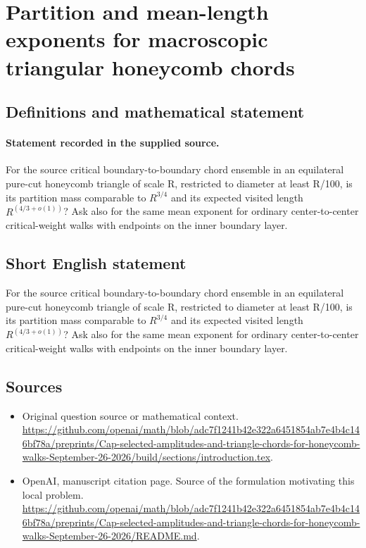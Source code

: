 \documentclass[11pt]{article}
\begin{document}
\section*{Partition and mean-length exponents for macroscopic triangular honeycomb chords}\label{statement}
\subsection{Definitions and mathematical statement}
\paragraph{Statement recorded in the supplied source.}
For the source critical boundary-to-boundary chord ensemble in an equilateral pure-cut honeycomb triangle of scale R, restricted to diameter at least R/100, is its partition mass comparable to $R^{3/4}$ and its expected visited length $R^(4/3+o(1))$? Ask also for the same mean exponent for ordinary center-to-center critical-weight walks with endpoints on the inner boundary layer.
\subsection{Short English statement}
For the source critical boundary-to-boundary chord ensemble in an equilateral pure-cut honeycomb triangle of scale R, restricted to diameter at least R/100, is its partition mass comparable to $R^{3/4}$ and its expected visited length $R^(4/3+o(1))$? Ask also for the same mean exponent for ordinary center-to-center critical-weight walks with endpoints on the inner boundary layer.
\subsection{Sources}
\begin{itemize}
\item[S1] Original question source or mathematical context.
\url{https://github.com/openai/math/blob/adc7f1241b42e322a6451854ab7e4b4c146bf78a/preprints/Cap-selected-amplitudes-and-triangle-chords-for-honeycomb-walks-September-26-2026/build/sections/introduction.tex}.
\item[S2] OpenAI, manuscript citation page. Source of the formulation motivating this local problem.
\url{https://github.com/openai/math/blob/adc7f1241b42e322a6451854ab7e4b4c146bf78a/preprints/Cap-selected-amplitudes-and-triangle-chords-for-honeycomb-walks-September-26-2026/README.md}.
\end{itemize}
\end{document}
